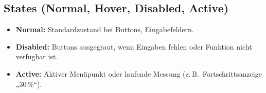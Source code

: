 \subsection{States (Normal, Hover, Disabled, Active)}
\begin{itemize}
	\item \textbf{Normal:} Standardzustand bei Buttons, Eingabefeldern.
	\item \textbf{Disabled:} Buttons ausgegraut, wenn Eingaben fehlen oder Funktion nicht verfügbar ist.
	\item \textbf{Active:} Aktiver Menüpunkt oder laufende Messung (z.\,B.\ Fortschrittsanzeige „30\,\%“).
\end{itemize}

\newpage
